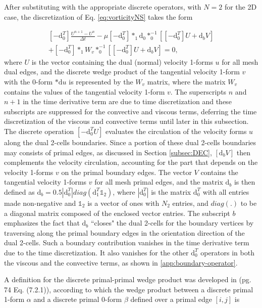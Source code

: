 \documentclass[final,12pt,times]{elsarticle}
\begin{document}
After substituting with the appropriate discrete operators, with $N=2$ for the 2D case, the discretization of Eq. \eqref{eq:vorticityNS}  takes the form       

\begin{multline}
\label{eq:discreteNS01}
[-\textrm{d}^T_0] \frac{U^{n+1} - U^n}{\Delta t} - \mu [-\textrm{d}^T_0] \ast_1 \textrm{d}_0 \ast^{-1}_0 \left[[-\textrm{d}^T_0] U + \textrm{d}_b V \right] \\ +  [-\textrm{d}^T_0] \ast_1 W_v \ast^{-1}_0 \left[[-\textrm{d}^T_0] U + \textrm{d}_b V\right] =0, 
\end{multline}
where $U$ is the vector containing the dual (normal) velocity 1-forms $u$ for all mesh dual edges, and the discrete wedge product of the tangential velocity 1-form $v$ with the 0-form $\ast \textrm{d} u$ is represented by the $W_v$ matrix, where the matrix $W_v$ contains the values of the tangential velocity 1-form $v$. The superscripts $n$ and $n+1$ in the time derivative term are due to time discretization and these subscripts are suppressed for the convective and viscous terms, deferring the time discretization of the viscous and convective terms until later in this subsection. The discrete operation $[-\textrm{d}^T_0 U]$ evaluates the circulation of the velocity forms $u$ along the dual 2-cells boundaries. Since a portion of these dual 2-cells boundaries may consists of primal edges, as discussed in Section \ref{subsec:DEC}, $[\textrm{d}_b V]$  then complements the velocity circulation, accounting for the part that depends on the velocity 1-forms $v$ on the primal boundary edges. The vector $V$ contains the tangential velocity 1-forms $v$ for all mesh primal edges, and the matrix $\textrm{d}_b$ is then defined as $\textrm{d}_b = 0.5 |\textrm{d}^T_0| diag(\textrm{d}^T_1 \mathbb{1}_2)$, where $|\textrm{d}^T_0|$ is the matrix $\textrm{d}^T_0$ with all entries made non-negative and $\mathbb{1}_2$ is a vector of ones with $N_2$ entries, and $diag(.)$ to be a diagonal matrix composed of the enclosed vector entries. The subscript $b$ emphasizes the fact that $\textrm{d}_b$ ``closes" the dual 2-cells for the boundary vertices by traversing along the primal boundary edges in the orientation direction of the dual 2-cells. Such a boundary contribution vanishes in the time derivative term  due to the time discretization. It also vanishes for the other $\textrm{d}^T_0$ operators in both the viscous and the convective terms, as shown in \ref{app:boundary-operator}.      

A definition for the discrete primal-primal wedge product was developed in \cite{hirani2003discrete} (pg. 74 Eq. (7.2.1)), according to which the wedge product between a discrete primal 1-form $\alpha$ and a discrete primal 0-form $\beta$ defined over a primal edge $[i,j]$ is 
\end{document}
